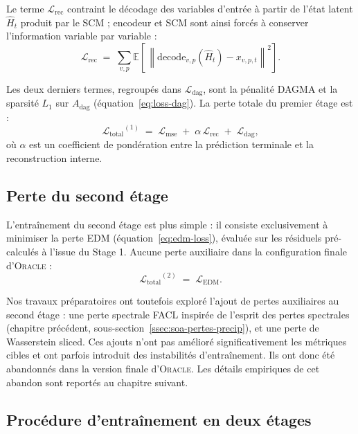 \documentclass[14pt,a4paper,openany]{extreport}
\theoremstyle{definition}
\newcommand{\Oracle}{\textsc{Oracle}}
\newcommand{\Adag}{\ensuremath{A_{\mathrm{dag}}}}
\newcommand{\Lmse}{\ensuremath{\mathcal{L}_{\mathrm{mse}}}}
\newcommand{\Lrec}{\ensuremath{\mathcal{L}_{\mathrm{rec}}}}
\newcommand{\LEDM}{\ensuremath{\mathcal{L}_{\mathrm{EDM}}}}
\newcommand{\Ltotal}{\ensuremath{\mathcal{L}_{\mathrm{total}}}}
\begin{document}
Le terme $\Lrec$ contraint le décodage des variables d'entrée à partir de l'état latent $\hat{H}_t$ produit par le SCM ; encodeur et SCM sont ainsi forcés à conserver l'information variable par variable :
\begin{equation}
  \Lrec \;=\; \sum_{v, p} \mathbb{E}\!\left[\, \left\| \mathrm{decode}_{v,p}\!\left( \hat{H}_t \right) - x_{v,p,t} \right\|^2 \right].
  \label{eq:loss-rec}
\end{equation}

Les deux derniers termes, regroupés dans $\mathcal{L}_{\mathrm{dag}}$, sont la pénalité DAGMA et la sparsité $L_1$ sur $\Adag$ (équation~\ref{eq:loss-dag}). La perte totale du premier étage est :
\begin{equation}
  \Ltotal^{(1)} \;=\; \Lmse \;+\; \alpha\, \Lrec \;+\; \mathcal{L}_{\mathrm{dag}},
  \label{eq:loss-total-stage1}
\end{equation}
où $\alpha$ est un coefficient de pondération entre la prédiction terminale et la reconstruction interne.

\subsection{Perte du second étage}
\label{ssec:oracle-pertes-stage2}

L'entraînement du second étage est plus simple : il consiste exclusivement à minimiser la perte EDM (équation~\ref{eq:edm-loss}), évaluée sur les résiduels pré-calculés à l'issue du Stage 1. Aucune perte auxiliaire dans la configuration finale d'\Oracle{} :
\begin{equation}
  \Ltotal^{(2)} \;=\; \LEDM.
  \label{eq:loss-total-stage2}
\end{equation}

Nos travaux préparatoires ont toutefois exploré l'ajout de pertes auxiliaires au second étage : une perte spectrale FACL inspirée de l'esprit des pertes spectrales (chapitre précédent, sous-section~\ref{ssec:soa-pertes-precip}), et une perte de Wasserstein sliced. Ces ajouts n'ont pas amélioré significativement les métriques cibles et ont parfois introduit des instabilités d'entraînement. Ils ont donc été abandonnés dans la version finale d'\Oracle{}. Les détails empiriques de cet abandon sont reportés au chapitre suivant.

\subsection{Procédure d'entraînement en deux étages}
\label{ssec:oracle-train-procedure}
\end{document}

